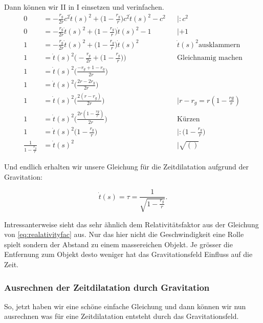 \begin{refsection}
\noindent{}Dann können wir \RN{2} in \RN{1} einsetzen und verinfachen.
\begin{align*}
0 &= -\frac{r_g}{2r} c^2 \dot t(s)^2 + \biggr( 1 - \frac{r_g}{r} \biggr) c^2 \dot t(s)^2 - c^2  && | : c^2
\\
0 &= -\frac{r_g}{2r}\dot t(s)^2 + \biggr( 1 - \frac{r_g}{r} \biggr) \dot t(s)^2 - 1 && | + 1
\\
1 &= -\frac{r_g}{2r}\dot t(s)^2 + \biggr( 1 - \frac{r_g}{r} \biggr) \dot t(s)^2 && \dot t(s)^2 \text{ausklammern}
\\
1 &= \dot t(s)^2 \biggr( -\frac{r_g}{2r} + \biggr( 1 - \frac{r_g}{r} \biggr) \biggr) && \text{Gleichnamig machen}
\\
1 &= \dot t(s)^2 \biggr( \frac{-r_g + 1 - r_g}{2r}\biggr)
\\
1 &= \dot t(s)^2 \biggr( \frac{2r-2r_g}{2r}\biggr)
\\
1 &= \dot t(s)^2 \biggr( \frac{2(r-r_g)}{2r}\biggr) && | r-r_g = r(1-\frac{rg}{r})
\\
1 &= \dot t(s)^2 \biggr( \frac{2r(1-\frac{rg}{r})}{2r}\biggr) && \text{Kürzen}
\\
1 &= \dot t(s)^2 \biggr( 1-\frac{r_g}{r} \biggr) && | : \biggr( 1-\frac{r_g}{r} \biggr)
\\
\frac{1}{1-\frac{r_g}{r}} &= \dot t(s)^2 && | \sqrt{()}
\end{align*}

\noindent{}Und endlich erhalten wir unsere Gleichung für die Zeitdilatation aufgrund der Gravitation:

\begin{equation}
\label{gps:equation:gravidilatation}
\dot t(s) = \tau = \frac{1}{\sqrt{1-\frac{r_g}{r}}}.
\end{equation}

\noindent{}Intressanterweise sieht das sehr ähnlich dem Relativitätsfaktor aus der Gleichung von \ref{eq:realativityfac} aus. Nur das hier nicht die Geschwindigkeit eine Rolle spielt sondern der Abstand zu einem massereichen Objekt. Je grösser die Entfernung zum Objekt desto weniger hat das Gravitationsfeld Einfluss auf die Zeit. 

\subsubsection{Ausrechnen der Zeitdilatation durch Gravitation}
So, jetzt haben wir eine schöne einfache Gleichung und dann können wir nun ausrechnen was für eine Zeitdilatation entsteht durch das Gravitationsfeld.


\end{refsection}
